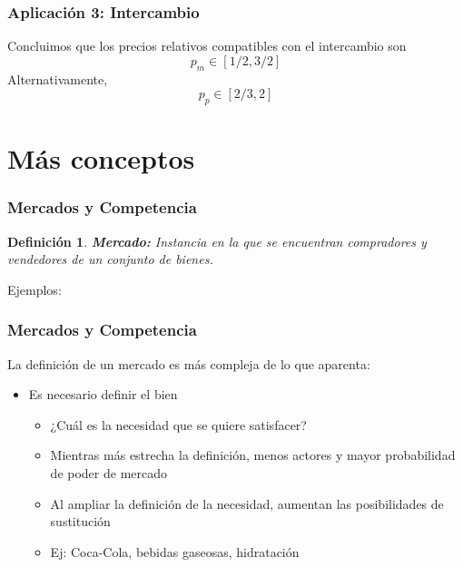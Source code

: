 \documentclass[dvipsnames,table]{beamer}
\newtheorem{mydef}{Definición}
\newcommand{\peq}[1]{{\scriptscriptstyle{#1}}}
\begin{document}
		\begin{frame}
			\frametitle{Aplicación 3: Intercambio}
			Concluimos que los precios relativos compatibles con el intercambio son $$p_\peq{m}\in[1/2,3/2]$$ Alternativamente, $$p_\peq{p}\in[2/3,2]$$
		\end{frame}

	\section{Más conceptos}

		\begin{frame}
			\frametitle{Mercados y Competencia}
			\begin{mydef}
				\textbf{Mercado:} Instancia en la que se encuentran compradores y vendedores de un conjunto de bienes.
			\end{mydef}
			Ejemplos:
			\begin{table}[htbp!]
				\centering
			\end{table}
		\end{frame}

	\begin{frame}
			\frametitle{Mercados y Competencia}
			La definición de un mercado es más compleja de lo que aparenta:
			\begin{itemize}
				\item Es necesario definir el bien
					\begin{itemize}
						\item ¿Cuál es la necesidad que se quiere satisfacer?
						\item Mientras más estrecha la definición, menos actores y mayor probabilidad de poder de mercado
						\item Al ampliar la definición de la necesidad, aumentan las posibilidades de sustitución
						\item Ej: Coca-Cola, bebidas gaseosas, hidratación
					\end{itemize}
			\end{itemize}
		\end{frame}
\end{document}
